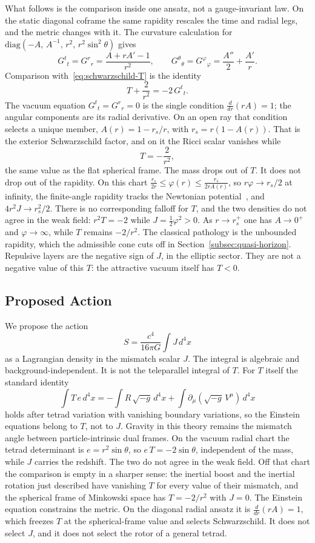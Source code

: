 \documentclass[a4paper]{article}
\begin{document}
What follows is the comparison inside one ansatz, not a gauge-invariant law. On the static diagonal coframe the same rapidity rescales the time and radial legs, and the metric changes with it. The curvature calculation for $\mathrm{diag}(-A,\,A^{-1},\,r^2,\,r^2\sin^2\theta)$ gives
\[
G^t{}_t=G^r{}_r=\frac{A+r A'-1}{r^2},\qquad
G^\theta{}_\theta=G^\varphi{}_\varphi=\frac{A''}{2}+\frac{A'}{r}.
\]
Comparison with~\eqref{eq:schwarzschild-T} is the identity
\begin{equation}
\label{eq:jt-dictionary}
T+\frac{2}{r^2}=-2\,G^t{}_t.
\end{equation}
The vacuum equation $G^t{}_t=G^r{}_r=0$ is the single condition $\frac{d}{dr}(rA)=1$; the angular components are its radial derivative. On an open ray that condition selects a unique member, $A(r)=1-r_s/r$, with $r_s=r(1-A(r))$. That is the exterior Schwarzschild factor, and on it the Ricci scalar vanishes while
\[
T=-\frac{2}{r^2},
\]
the same value as the flat spherical frame. The mass drops out of $T$. It does not drop out of the rapidity. On this chart $\frac{r_s}{2r}\le\varphi(r)\le\frac{r_s}{2rA(r)}$, so $r\varphi\to r_s/2$ at infinity, the finite-angle rapidity tracks the Newtonian potential~\cite{newton1687}, and $4r^2 J\to r_s^2/2$. There is no corresponding falloff for $T$, and the two densities do not agree in the weak field: $r^2 T=-2$ while $J=\tfrac12\varphi^2>0$. As $r\to r_s^+$ one has $A\to 0^+$ and $\varphi\to\infty$, while $T$ remains $-2/r^2$. The classical pathology is the unbounded rapidity, which the admissible cone cuts off in Section~\ref{subsec:quasi-horizon}. Repulsive layers are the negative sign of $J$, in the elliptic sector. They are not a negative value of this $T$: the attractive vacuum itself has $T<0$.

\subsection{Proposed Action}

We propose the action
\[
S = \frac{c^4}{16\pi G} \int J \, d^4x
\]
as a Lagrangian density in the mismatch scalar $J$. The integral is algebraic and background-independent. It is not the teleparallel integral of $T$. For $T$ itself the standard identity
\[
\int T \, e \, d^4x = -\int R \, \sqrt{-g} \, d^4x + \int \partial_\mu(\sqrt{-g}\, V^\mu)\, d^4x
\]
holds after tetrad variation with vanishing boundary variations, so the Einstein equations belong to $T$, not to $J$. Gravity in this theory remains the mismatch angle between particle-intrinsic dual frames. On the vacuum radial chart the tetrad determinant is $e=r^2\sin\theta$, so $e\,T=-2\sin\theta$, independent of the mass, while $J$ carries the redshift. The two do not agree in the weak field. Off that chart the comparison is empty in a sharper sense: the inertial boost and the inertial rotation just described have vanishing $T$ for every value of their mismatch, and the spherical frame of Minkowski space has $T=-2/r^2$ with $J=0$. The Einstein equation constrains the metric. On the diagonal radial ansatz it is $\frac{d}{dr}(rA)=1$, which freezes $T$ at the spherical-frame value and selects Schwarzschild. It does not select $J$, and it does not select the rotor of a general tetrad.
\end{document}

